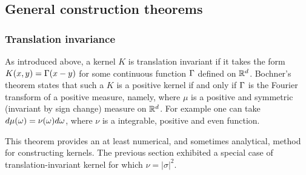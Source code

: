 %
%
%
%

\subsection{General construction theorems}

\subsubsection{Translation invariance}
As introduced above, a kernel $K$ is translation invariant if it takes the form $K(x,y)  = \Gamma(x-y)$ for some continuous function
$\Gamma$ defined on ${\mathbb{R}}^d$. 
Bochner's theorem \citep{bochner1933vorlesungen} states that such a $K$ is a positive kernel if and only if $\Gamma$
is the Fourier transform of a positive measure, namely,
where $\mu$ is a positive and symmetric (invariant by sign change) measure on ${\mathbb{R}}^d$. For
example one can take $d\mu(\omega)  = \nu(\omega) d\omega$, where $\nu$ is a integrable, positive and even function.

This theorem provides an at least numerical,
and sometimes  analytical, method for constructing kernels. The previous section exhibited a special case of translation-invariant kernel for which $\nu = |\sigma|^2$. 

